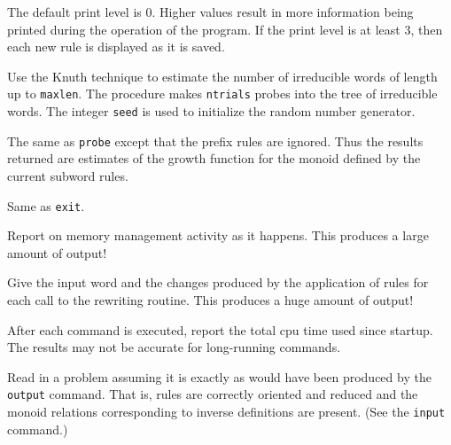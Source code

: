 \medskip
{}

\nobreak

The default print level is 0.  Higher values result in more
information being printed during the operation of the program.  If the
print level is at least 3, then each new rule is displayed as it is
saved.

\medskip
{}

\nobreak

Use the Knuth technique to estimate the number of irreducible words of
length up to {\tt maxlen}.  The procedure makes {\tt ntrials}
probes into the tree of irreducible words.  The integer {\tt seed}
is used to initialize the random number generator.

\medskip
{}

\nobreak

The same as {\tt probe} except that the prefix rules are ignored.
Thus the results returned are estimates of the growth function for the
monoid defined by the current subword rules.

\medskip
{}

\nobreak

Same as {\tt exit}.

\medskip
{}

\nobreak

Report on memory management activity as it happens.  This produces a
large amount of output!

\medskip
{}

\nobreak

Give the input word and the changes produced by the application of
rules for each call to the rewriting routine.  This produces a huge
amount of output!

\medskip
{}

\nobreak

After each command is executed, report the total cpu time used since
startup.  The results may not be accurate for long-running commands.

\medskip
{}

\nobreak

Read in a problem assuming it is exactly as would have been produced
by the {\tt output} command.  That is, rules are correctly oriented
and reduced and the monoid relations corresponding to inverse
definitions are present.  (See the {\tt input} command.)

